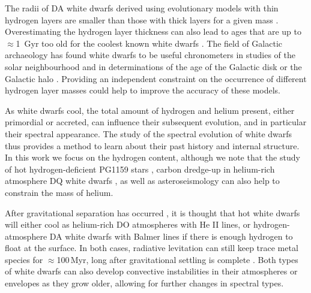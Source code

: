 \documentclass[a4paper,fleqn,usenatbib]{mnras}
\begin{document}
The radii of DA white dwarfs derived using evolutionary models with thin hydrogen layers are smaller than those with thick layers for a given mass \citep{wood90,t17}. Overestimating the hydrogen layer thickness can also lead to ages that are up to $\approx$1~Gyr too old for the coolest known white dwarfs \citep{fontaine01}. The field of Galactic archaeology has found white dwarfs to be useful chronometers in studies of the solar neighbourhood \citep{tremblay14} and in determinations of the age of the Galactic disk \citep{winget87,fontaine01,wood90,leggett98,chen12} or the Galactic halo \citep{kalirai12,kilic19}. Providing an independent constraint on the occurrence of different hydrogen layer masses could help to improve the accuracy of these models. 

As white dwarfs cool, the total amount of hydrogen and helium present, either primordial or accreted, can influence their subsequent evolution, and in particular their spectral appearance. The study of the spectral evolution of white dwarfs \citep{sion84,fontaine87,bergeron01,tremblay08} thus provides a method to learn about their past history and internal structure. In this work we focus on the hydrogen content, although we note that the study of hot hydrogen-deficient PG1159 stars \citep{werner06,miller16}, carbon dredge-up in helium-rich atmosphere DQ white dwarfs \citep{pelletier86,coutu19,koester19}, as well as asteroseismology can also help to constrain the mass of helium.

After gravitational separation has occurred \citep{schatzman45}, it is thought that hot white dwarfs will either cool as helium-rich DO atmospheres with He {\small II} lines, or hydrogen-atmosphere DA white dwarfs with Balmer lines if there is enough hydrogen to float at the surface. In both cases, radiative levitation can still keep trace metal species for $\approx$100\,Myr, long after gravitational settling is complete \citep{chayer14,koester14,werner18}. Both types of white dwarfs can also develop convective instabilities in their atmospheres or envelopes as they grow older, allowing for further changes in spectral types.
\end{document}
